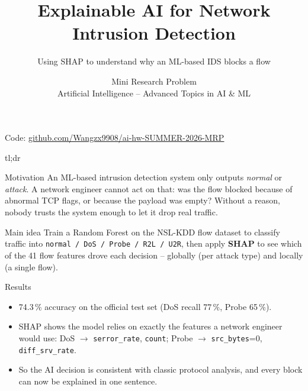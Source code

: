 \documentclass[11pt,aspectratio=169]{beamer}
\title{\bfseries Explainable AI for Network Intrusion Detection}
\subtitle{Using SHAP to understand why an ML-based IDS blocks a flow}
\author{Mini Research Problem \\ Artificial Intelligence -- Advanced Topics in AI \& ML}
\date{}
\newcommand{\f}[1]{{\small\texttt{#1}}}
\newcommand{\link}[2]{\href{#1}{\color{accent}\underline{#2}}}
\newcommand{\repo}{https://github.com/Wangzx9908/ai-hw-SUMMER-2026-MRP}
\begin{document}
{
\begin{frame}[plain]
  \titlepage
  \vspace{-1.5em}
  \centering\small Code: \link{\repo}{github.com/Wangzx9908/ai-hw-SUMMER-2026-MRP}
\end{frame}}

\begin{frame}{tl;dr}
\small
\begin{block}{Motivation}
An ML-based intrusion detection system only outputs \emph{normal} or
\emph{attack}. A network engineer cannot act on that: was the flow blocked
because of abnormal TCP flags, or because the payload was empty? Without a
reason, nobody trusts the system enough to let it drop real traffic.
\end{block}
\begin{block}{Main idea}
Train a Random Forest on the NSL-KDD flow dataset to classify traffic into
\f{normal / DoS / Probe / R2L / U2R}, then apply \textbf{SHAP} to see which of
the 41 flow features drove each decision -- globally (per attack type) and
locally (a single flow).
\end{block}
\begin{block}{Results}
\begin{itemize}\itemsep1pt
  \item 74.3\,\% accuracy on the official test set (DoS recall 77\,\%, Probe 65\,\%).
  \item SHAP shows the model relies on exactly the features a network engineer
        would use: DoS $\to$ \f{serror\_rate}, \f{count}; Probe $\to$ \f{src\_bytes}=0,
        \f{diff\_srv\_rate}.
  \item So the AI decision is consistent with classic protocol analysis, and
        every block can now be explained in one sentence.
\end{itemize}
\end{block}
\end{frame}
\end{document}
